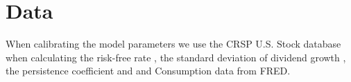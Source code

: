 \section{Data} \label{sec:Data}

When calibrating the model parameters we use the CRSP U.S. Stock database when calculating the risk-free rate \cite{CRSP:DATA_Bonds_Inflation}, the standard deviation of dividend growth \cite{CRSP:DATA_Annual}, the persistence coefficient \cite{CRSP:DATA_Monthly} and  and Consumption data from FRED. 


\cite{FRED:CONSDAT}
